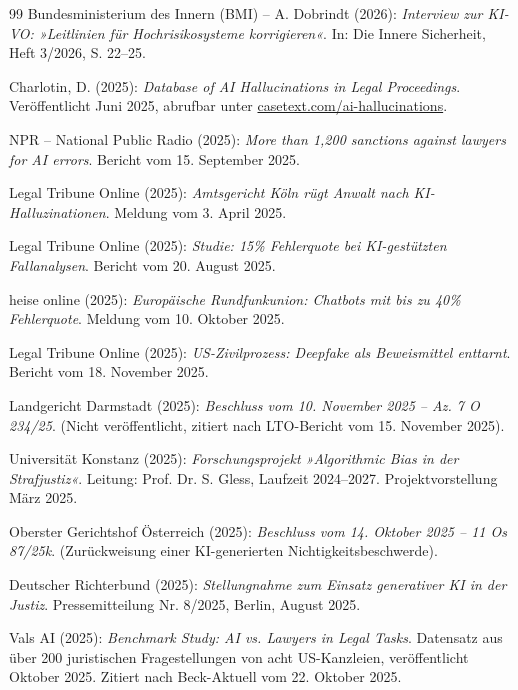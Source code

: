 \documentclass[12pt,a4paper]{article}
\begin{document}
\begin{thebibliography}{99}
		 Bundesministerium des Innern (BMI) – A. Dobrindt (2026): \emph{Interview zur KI-VO: »Leitlinien für Hochrisikosysteme korrigieren«}. In: Die Innere Sicherheit, Heft 3/2026, S. 22–25.
		
		 Charlotin, D. (2025): \emph{Database of AI Hallucinations in Legal Proceedings}. Veröffentlicht Juni 2025, abrufbar unter \url{casetext.com/ai-hallucinations}.
		
		 NPR – National Public Radio (2025): \emph{More than 1,200 sanctions against lawyers for AI errors}. Bericht vom 15. September 2025.
		
		 Legal Tribune Online (2025): \emph{Amtsgericht Köln rügt Anwalt nach KI-Halluzinationen}. Meldung vom 3. April 2025.
		
		 Legal Tribune Online (2025): \emph{Studie: 15\% Fehlerquote bei KI-gestützten Fallanalysen}. Bericht vom 20. August 2025.
		
		 heise online (2025): \emph{Europäische Rundfunkunion: Chatbots mit bis zu 40\% Fehlerquote}. Meldung vom 10. Oktober 2025.
		
		 Legal Tribune Online (2025): \emph{US-Zivilprozess: Deepfake als Beweismittel enttarnt}. Bericht vom 18. November 2025.
		
		 Landgericht Darmstadt (2025): \emph{Beschluss vom 10. November 2025 – Az. 7 O 234/25}. (Nicht veröffentlicht, zitiert nach LTO-Bericht vom 15. November 2025).
		
		 Universität Konstanz (2025): \emph{Forschungsprojekt »Algorithmic Bias in der Strafjustiz«}. Leitung: Prof. Dr. S. Gless, Laufzeit 2024–2027. Projektvorstellung März 2025.
		
		 Oberster Gerichtshof Österreich (2025): \emph{Beschluss vom 14. Oktober 2025 – 11 Os 87/25k}. (Zurückweisung einer KI-generierten Nichtigkeitsbeschwerde).
		
		 Deutscher Richterbund (2025): \emph{Stellungnahme zum Einsatz generativer KI in der Justiz}. Pressemitteilung Nr. 8/2025, Berlin, August 2025.
		
		 Vals AI (2025): \emph{Benchmark Study: AI vs. Lawyers in Legal Tasks}. Datensatz aus über 200 juristischen Fragestellungen von acht US-Kanzleien, veröffentlicht Oktober 2025. Zitiert nach Beck-Aktuell vom 22. Oktober 2025.
		

\end{thebibliography}
\end{document}
